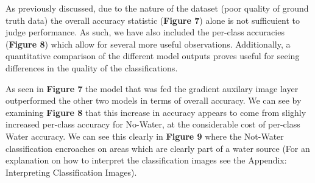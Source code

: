 \documentclass[12pt]{article}
\begin{document}
\begin{figure}[!htb]
\end{figure}



As previously discussed, due to the nature of the dataset (poor quality of ground truth data) the overall accuracy statistic (\textbf{Figure 7}) alone is not sufficuient to judge performance. As such, we have also included the per-class accuracies (\textbf{Figure 8}) which allow for several more useful observations. Additionally, a quantitative comparison of the different model outputs proves useful for seeing differences in the quality of the classifications.

As seen in \textbf{Figure 7} the model that was fed the gradient auxilary image layer outperformed the other two models in terms of overall accuracy. We can see by examining \textbf{Figure 8} that this increase in accuracy appears to come from slighly increased per-class accuracy for No-Water, at the considerable cost of per-class Water accuracy. We can see this clearly in \textbf{Figure 9} where the Not-Water classification encroaches on areas which are clearly part of a water source (For an explanation on how to interpret the classification images see the Appendix: Interpreting Classification Images).

\begin{figure}[H]
\end{figure}
\end{document}

